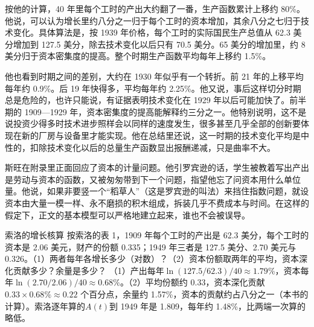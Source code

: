 按他的计算，40 年里每个工时的产出大约翻了一番，生产函数累计上移约 80\%\cite{solow1957}。他说，可以认为增长里约八分之一归于每个工时的资本增加，其余八分之七归于技术变化\cite{solow1957}。具体算法是，按 1939 年价格，每个工时的实际国民生产总值从 62.3 美分增加到 127.5 美分，除去技术变化以后只有 70.5 美分\cite{solow1957}。65 美分的增加里，约 8 美分归于资本密集度的提高\cite{solow1957}。整个时期生产函数平均每年上移约 1.5\%\cite{solow1957}。

他也看到时期之间的差别，大约在 1930 年似乎有一个转折\cite{solow1957}。前 21 年的上移平均每年约 0.9\%\cite{solow1957}。后 19 年快得多，平均每年约 2.25\%\cite{solow1957}。他又说，事后这样切分时期总是危险的，也许只能说，有证据表明技术变化在 1929 年以后可能加快了\cite{solow1957}。前半期的 1909—1929 年，资本密集度的提高能解释约三分之一\cite{solow1957}。他特别说明，这不是说投资少得多时技术进步照样会以同样的速度发生，很多甚至几乎全部的创新要体现在新的厂房与设备里才能实现\cite{solow1957}。他在总结里还说，这一时期的技术变化平均是中性的，扣除技术变化以后的总量生产函数显出报酬递减，只是曲率不大\cite{solow1957}。

斯旺在附录里正面回应了资本的计量问题。他引罗宾逊的话，学生被教着写出产出是劳动与资本的函数，又被匆匆带到下一个问题，指望他忘了问资本用什么单位量\cite{swan1956}。他说，如果非要竖一个“稻草人”（这是罗宾逊的叫法）来挡住指数问题，就设资本由大量一模一样、永不磨损的积木组成，拆装几乎不费成本与时间\cite{swan1956}。在这样的假定下，正文的基本模型可以严格地建立起来，谁也不会被误导\cite{swan1956}。

\begin{example}{索洛的增长核算}\label{ex:solow-accounting}
按索洛的表 1，1909 年每个工时的产出是 62.3 美分，每个工时的资本是 2.06 美元，财产的份额 0.335；1949 年三者是 127.5 美分、2.70 美元与 0.326\cite{solow1957}。（1）两者每年各增长多少（对数）？（2）资本份额取两年的平均，资本深化贡献多少？余量是多少？
\solution
（1）产出每年$\ln(127.5/62.3)/40\approx1.79\%$，资本每年$\ln(2.70/2.06)/40\approx0.68\%$。（2）平均份额约 0.33，资本深化贡献$0.33\times0.68\%\approx0.22$ 个百分点，余量约 1.57\%，资本的贡献约占八分之一（本书的计算）。索洛逐年算的$A(t)$到 1949 年是 1.809，每年约 1.48\%，比两端一次算的略低。
\end{example}

